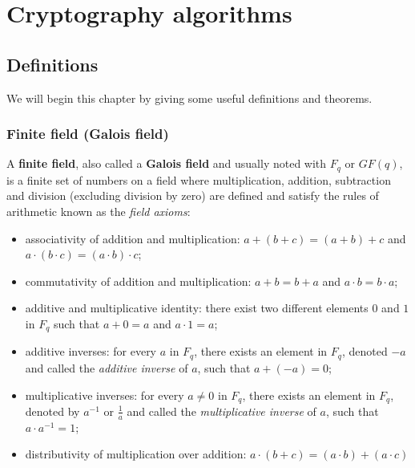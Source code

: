\chapter{Cryptography algorithms} %
\label{ch:crypto_algo}


\section{Definitions}
We will begin this chapter by giving some useful definitions and theorems.


\subsection{Finite field (Galois field)}
A \textbf{finite field}, also called a \textbf{Galois field} and usually noted with $F_q$ or $GF(q)$, is a finite set of numbers on a field where multiplication, addition, subtraction and division (excluding division by zero) are defined and satisfy the rules of arithmetic known as the \textit{field axioms}:

\begin{itemize}
    \item associativity of addition and multiplication: $a + (b + c) = (a + b) + c$ and $a \cdot (b \cdot c) = (a \cdot b) \cdot c$;
        
    \item commutativity of addition and multiplication: $a + b = b + a$ and $a \cdot b = b \cdot a$;
    
    \item additive and multiplicative identity: there exist two different elements $0$ and $1$ in $F_q$ such that $a + 0 = a$ and $a \cdot 1 = a$;

    \item additive inverses: for every $a$ in $F_q$, there exists an element in $F_q$, denoted $-a$ and called the \textit{additive inverse} of $a$, such that $a + (-a) = 0$;
    
    \item multiplicative inverses: for every $a \neq 0$ in $F_q$, there exists an element in $F_q$, denoted by $a^{−1}$ or $\frac{1}{a}$ and called the \textit{multiplicative inverse} of $a$, such that $a \cdot a^{−1} = 1$;

    \item distributivity of multiplication over addition: $a \cdot (b+c) = (a \cdot b) + (a \cdot c)$
\end{itemize}

